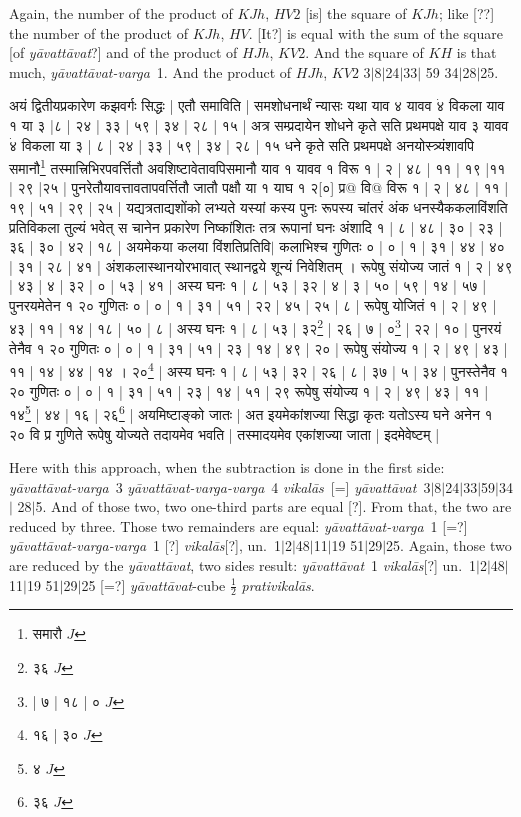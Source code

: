 \documentclass[12pt]{book}
\def\prativikalas{\textit{prati\-vi\-ka\-l\=as}}
\def\ya{\textit{y\=avat\-t\=avat}}
\def\yava{\textit{y\=avat\-t\=avat-varga}}
\def\yavava{\textit{y\=avat\-t\=avat-varga-varga}}
\def\vikalas{\textit{vi\-ka\-l\=as}}
\def\danda{$|$}
\begin{document}
Again, the number of the product of $KJh$, $HV2$ [is] the square of $KJh$; like [??]
the number of the product of $KJh$, $HV$. [It?] is equal with the sum of the square [of
\ya?] and of the
product of $HJh$, $KV2$. And the square of $KH$ is that much, \yava\ 1. And the
product of $HJh$, $KV2$ 3\danda 8\danda 24\danda 33\danda
59 34\danda 28\danda 25. 

\newpage

{\s अयं
द्वितीयप्रकारेण कझवर्गः सिद्धः | एतौ समाविति | समशोधनार्थं न्यासः
यथा याव ४ यावव $\dot{४}$ विकला याव १ या ३ |८ | २४ | ३३ | ५९ | ३४ | २८ | १५ | अत्र
सम्प्रदायेन शोधने कृते सति प्रथमपक्षे याव ३ यावव $\dot{४}$ विकला या ३ | ८ | २४ |
३३ | ५९ | ३४ | २८ | १५ धने कृते सति प्रथमपक्षे अनयोस्त्र्यंशावपि समानौ\footnote{{\s समारौ} $J$} 
तस्मात्त्रिभिरपवर्त्तितौ अवशिष्टावेतावपिसमानौ याव १ यावव १ विरू १ | २ | ४८ | ११ |
१९ |११ | २९ |२५ |
पुनरेतौयावत्तावतापवर्त्तितौ जातौ पक्षौ या १ याघ १ २[०] प्र@ वि@ विरू १ | २ | ४८ | ११ | १९ | ५१ | २९ | २५ |
यद्यत्रताद्यशोंको लभ्यते यस्यां कस्य पुनः रूपस्य चांतरं अंक धनस्यैककलाविंशति प्रतिविकला तुल्यं भवेत्
स चानेन प्रकारेण निष्कांशितः तत्र रूपानां घनः अंशादि १ | ८ | ४८ | ३० | २३ | ३६ | ३० | ४२ | १८ | अयमेकया कलया विंशतिप्रतिवि$|$ कलाभिश्च गुणितः ० | ० | १ | ३१ | ४४ | ४० | ३१ | २८ | ४१ | अंशकलास्थानयोरभावात् स्थानद्वये शून्यं निवेशितम् ।
रूपेषु संयोज्य जातं १ | २ | ४९ | ४३ | ४ | ३२ | ० | ५३ | ४१ | अस्य घनः १ | ८ | ५३ | ३२ | ४ | ३ | ५० | ५९ | १४ | ५७ | पुनरयमेतेन १ २० गुणितः ० | ० | १ | ३१ | ५१ | २२ | ४५ | २५ | ८ | रूपेषु योजितं १ | २ | ४९ | ४३ | ११ | १४ | १८ | ५० | ८ | अस्य घनः १ | ८ | ५३ | ३२\footnote{{\s ३६} $J$} | २६ | ७ | ०\footnote{{\s | ७ | १८ | ०} $J$} | २२ | १० | पुनरयं तेनैव १ २० गुणितः ० | ० | १ | ३१ | ५१ | २३ | १४ | ४९ | २० | रूपेषु संयोज्य १ | २ | ४९ | ४३ | ११ | १४ | ४४ | १४ । २०\footnote{{\s १६ | ३०} $J$} | अस्य घनः १ | ८ | ५३ | ३२ | २६ | ८ | ३७ | ५ | ३४ |  पुनस्तेनैव १ २० गुणितः ० | ० | १ | ३१ | ५१ | २३ | १४ | ५१ | २९
रूपेषु संयोज्य १ | २ | ४९ | ४३ | ११ | १४\footnote{{\s ४} $J$} | ४४ | १६ | २६\footnote{{\s ३६} $J$} | अयमिष्टाङ्को जातः | अत इयमेकांशज्या सिद्धा कृतः यतोऽस्य घने अनेन १ २० वि प्र
गुणिते रूपेषु योज्यते तदायमेव भवति | तस्मादयमेव
एकांशज्या जाता | इदमेवेष्टम् |}

\newpage

Here with this approach, when the subtraction is done in the first side:
\yava\ 3 \yavava\ 4 \vikalas\ [=] \ya\ 3\danda 8\danda 24\danda 33\danda 59\danda 34\danda
28\danda 5. And of those two, two one-third parts are equal [?]. 
From that, the two are reduced by three. Those two remainders are equal:
\yava\ 1 [=?] \yavava\ 1 [?] \vikalas [?], un.\ 1\danda 2\danda 48\danda 11\danda 19
51\danda 29\danda 25.
Again, those two are reduced by the \ya, two sides result: 
\ya\ 1 \vikalas [?] un.\  1\danda 2\danda 48\danda 11\danda 19
51\danda 29\danda 25 [=?] \ya-cube $\frac{1}{2}$ \prativikalas.
\end{document}
